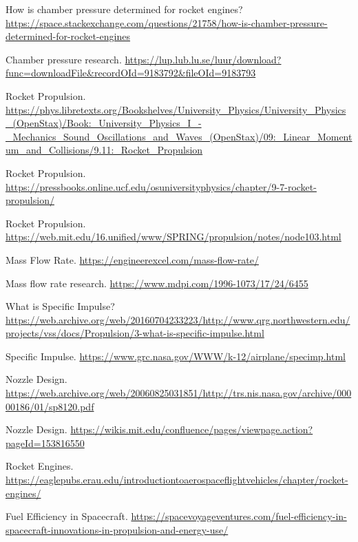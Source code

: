 \documentclass[12pt,a4paper]{article}
\begin{document}
\begin{thebibliography}{99}

How is chamber pressure determined for rocket engines? \url{https://space.stackexchange.com/questions/21758/how-is-chamber-pressure-determined-for-rocket-engines}

Chamber pressure research. \url{https://lup.lub.lu.se/luur/download?func=downloadFile&recordOId=9183792&fileOId=9183793}

Rocket Propulsion. \url{https://phys.libretexts.org/Bookshelves/University_Physics/University_Physics_(OpenStax)/Book:_University_Physics_I_-_Mechanics_Sound_Oscillations_and_Waves_(OpenStax)/09:_Linear_Momentum_and_Collisions/9.11:_Rocket_Propulsion}

Rocket Propulsion. \url{https://pressbooks.online.ucf.edu/osuniversityphysics/chapter/9-7-rocket-propulsion/}

Rocket Propulsion. \url{https://web.mit.edu/16.unified/www/SPRING/propulsion/notes/node103.html}

Mass Flow Rate. \url{https://engineerexcel.com/mass-flow-rate/}

Mass flow rate research. \url{https://www.mdpi.com/1996-1073/17/24/6455}

What is Specific Impulse? \url{https://web.archive.org/web/20160704233223/http://www.qrg.northwestern.edu/projects/vss/docs/Propulsion/3-what-is-specific-impulse.html}

Specific Impulse. \url{https://www.grc.nasa.gov/WWW/k-12/airplane/specimp.html}

Nozzle Design. \url{https://web.archive.org/web/20060825031851/http://trs.nis.nasa.gov/archive/00000186/01/sp8120.pdf}

Nozzle Design. \url{https://wikis.mit.edu/confluence/pages/viewpage.action?pageId=153816550}

Rocket Engines. \url{https://eaglepubs.erau.edu/introductiontoaerospaceflightvehicles/chapter/rocket-engines/}

Fuel Efficiency in Spacecraft. \url{https://spacevoyageventures.com/fuel-efficiency-in-spacecraft-innovations-in-propulsion-and-energy-use/}

\end{thebibliography}
\end{document}
